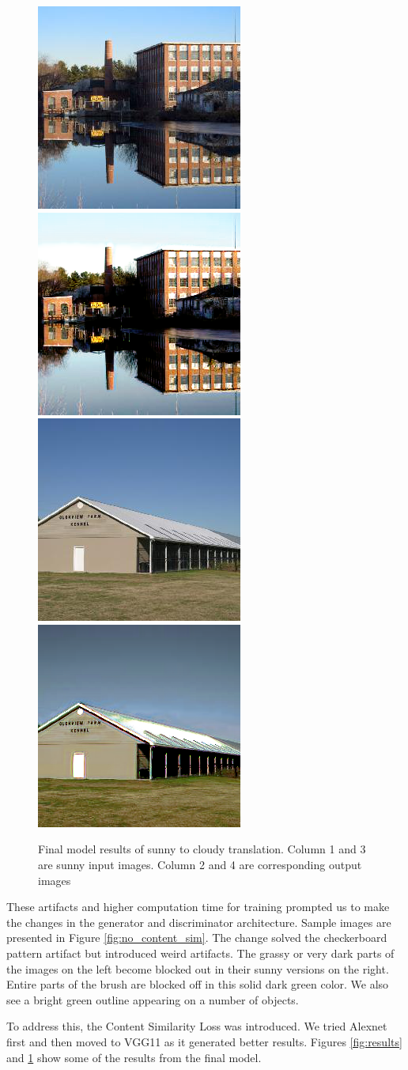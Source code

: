 \documentclass[10pt,twocolumn,letterpaper]{article}
\begin{document}
\begin{figure}[htbp]
    \includegraphics[width=.23\textwidth]{images/68_B.png}\hfill
  \includegraphics[width=.23\textwidth]{images/68_B2A.png}\hfill
  \hspace{1em}
  \includegraphics[width=.23\textwidth]{images/25_B.png}\hfill
  \includegraphics[width=.23\textwidth]{images/25_B2A.png}\hfill    
  \caption{Final model results of sunny to cloudy translation. Column 1 and 3 are sunny input images. Column 2 and 4 are corresponding output images }\label{fig:results2}
\end{figure}


These artifacts and higher computation time for training prompted us to make the changes in the generator and discriminator architecture. Sample images are presented in Figure \ref{fig:no_content_sim}. The change solved the checkerboard pattern artifact but introduced weird artifacts. The grassy or very dark parts of the images on the left become blocked out in their sunny versions on the right. Entire parts of the brush are blocked off in this solid dark green color. We also see a bright green outline appearing on a number of objects. 

To address this, the Content Similarity Loss was introduced. We tried Alexnet first and then moved to VGG11 as it generated better results. Figures \ref{fig:results} and \ref{fig:results2} show some of the results from the final model.
\end{document}
